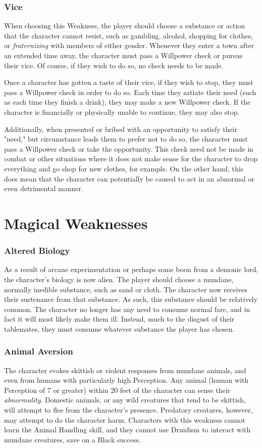 \documentclass[oneside]{book}
\begin{document}
\begin{multicols}{2}
\subsubsection{Vice}
When choosing this Weakness, the player should choose a substance or action that the character cannot resist, such as gambling, alcohol, shopping for clothes, or \emph{fraternizing} with members of either gender. Whenever they enter a town after an extended time away, the character must pass a Willpower check or pursue their vice. Of course, if they wish to do so, no check needs to be made.

Once a character has gotten a taste of their vice, if they wish to stop, they must pass a Willpower check in order to do so. Each time they satiate their need (such as each time they finish a drink), they may make a new Willpower check. If the character is financially or physically unable to continue, they may also stop. 

Additionally, when presented or bribed with an opportunity to satisfy their "need," but circumstance leads them to prefer not to do so, the character must pass a Willpower check or take the opportunity. This check need not be made in combat or other situations where it does not make sense for the character to drop everything and go shop for new clothes, for example. On the other hand, this does mean that the character can potentially be caused to act in an abnormal or even detrimental manner. 

\section{Magical Weaknesses}
\subsubsection{Altered Biology}
As a result of arcane experimentation or perhaps some boon from a demonic lord, the character's biology is now alien. The player should choose a mundane, normally inedible substance, such as sand or cloth. The character now receives their sustenance from that substance. As such, this substance should be relatively common. The character no longer has any need to consume normal fare, and in fact it will most likely make them ill. Instead, much to the disgust of their tablemates, they must consume whatever substance the player has chosen. 

\subsubsection{Animal Aversion}
The character evokes skittish or violent responses from mundane animals, and even from humans with particularly high Perception. Any animal (human with Perception of 7 or greater) within 20 feet of the character can sense their \emph{abnormality}. Domestic animals, or any wild creatures that tend to be skittish, will attempt to flee from the character's presence. Predatory creatures, however, may attempt to do the character harm. Characters with this weakness cannot learn the Animal Handling skill, and they cannot use Druidism to interact with mundane creatures, save on a Black success. 


\end{multicols}
\end{document}
